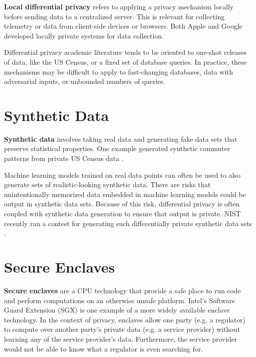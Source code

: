 \documentclass[nobib]{tufte-handout}
\begin{document}
\textbf{Local differential privacy} refers to applying a privacy mechanism
locally before sending data to a centralized server. This is relevant for
collecting telemetry or data from client-side devices or browsers. Both Apple
\cite{apple-local-differential-privacy} and Google \cite{erlingsson2014rappor}
developed locally private systems for data collection.

Differential privacy academic literature tends to be oriented to one-shot
releases of data, like the US Census, or a fixed set of database queries. In
practice, these mechanisms may be difficult to apply to fast-changing databases,
data with adversarial inputs, or unbounded numbers of queries.

\section{Synthetic Data}

\textbf{Synthetic data} involves taking real data and generating fake data sets
that preserve statistical properties. One example generated synthetic commuter
patterns from private US Census data \cite{DBLP:conf/icde/MachanavajjhalaKAGV08}.

Machine learning models trained on real data points can often be used to also
generate sets of realistic-looking synthetic data. There are risks that
unintentionally memorized data \cite{DBLP:journals/corr/abs-1802-08232} embedded
in machine learning models could be output in synthetic data sets. Because of
this risk, differential privacy is often coupled with synthetic data generation
to ensure that output is private. NIST recently ran a contest for generating
such differentially private synthetic data sets \cite{nist-synthetic-data}.

\section{Secure Enclaves}

\textbf{Secure enclaves} are a CPU technology that provide a safe place to run
code and perform computations on an otherwise unsafe platform. Intel's Software
Guard Extension (SGX) \cite{intel-sgx} is one example of a more widely
available enclave technology. In the context of privacy, enclaves allow one
party (e.g. a regulator) to compute over another party’s private data (e.g. a
service provider) without learning any of the service provider’s data.
Furthermore, the service provider would not be able to know what a regulator is
even searching for.
\end{document}
